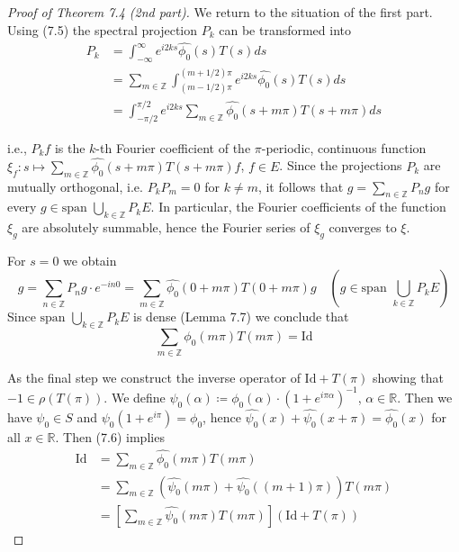 \begin{proof}[Proof of Theorem 7.4 (2nd part)]
		We return to the situation of the first part.
		Using (7.5) the spectral projection $P_{k}$ can be transformed into
		\begin{align*}
			P_{k} &= \int_{-\infty}^{\infty} e^{i2ks}\hat{\phi_{0}}(s)T(s)ds \\
			&= \sum_{m\in\mathbb{Z}} \int_{(m-1/2)\pi}^{(m+1/2)\pi} e^{i2ks}\hat{\phi_{0}}(s)T(s)ds \\
			&= \int_{-\pi/2}^{\pi/2} e^{i2ks}\sum_{m\in\mathbb{Z}}\hat{\phi_{0}}(s+m\pi)T(s+m\pi)ds
		\end{align*}


\newpage
i.e., $P_{k}f$ is the $k$-th Fourier coefficient of the $\pi$-periodic, continuous function $\xi_{f} \colon s \mapsto \sum_{m\in\mathbb{Z}} \hat{\phi_{0}}(s+m\pi)T(s+m\pi)f$, $f \in E$.
Since the projections $P_{k}$ are mutually orthogonal, i.e. $P_{k}P_{m} = 0$ for $k \neq m$, it follows that $g = \sum_{n\in\mathbb{Z}} P_{n}g$ for every $g \in \text{span }\bigcup_{k\in\mathbb{Z}} P_{k}E$.
In particular, the Fourier coefficients of the function $\xi_{g}$ are absolutely summable, hence the Fourier series of $\xi_{g}$ converges to $\xi$.

For $s = 0$ we obtain
\[
g = \sum_{n\in\mathbb{Z}} P_{n}g\cdot e^{-in0} = \sum_{m\in\mathbb{Z}} \hat{\phi_{0}}(0 + m\pi)T(0 + m\pi)g \quad (g \in \text{span }\bigcup_{k\in\mathbb{Z}} P_{k}E)
\]
Since $\text{span }\bigcup_{k\in\mathbb{Z}} P_{k}E$ is dense (Lemma 7.7) we conclude that
\begin{equation}\label{eq:a3-7.6}
	\sum_{m\in\mathbb{Z}} \phi_{0}(m\pi)T(m\pi) = \text{Id}
\end{equation}

As the final step we construct the inverse operator of $\text{Id} + T(\pi)$ showing that $-1 \in \rho(T(\pi))$.
We define $\psi_{0}(\alpha) \coloneqq \phi_{0}(\alpha)\cdot(1 + e^{i\pi\alpha})^{-1}$, $\alpha \in \mathbb{R}$.
Then we have $\psi_{0} \in S$ and $\psi_{0}(1 + e^{i\pi}) = \phi_{0}$, 
hence $\hat{\psi_{0}}(x) + \hat{\psi_{0}}(x + \pi) = \hat{\phi_{0}}(x)$ for all $x \in \mathbb{R}$.
Then (7.6) implies
\begin{align*}
	\text{Id} &= \sum_{m\in\mathbb{Z}} \hat{\phi_{0}}(m\pi)T(m\pi) \\
	&= \sum_{m\in\mathbb{Z}} (\hat{\psi_{0}}(m\pi) + \hat{\psi_{0}}((m+1)\pi))T(m\pi) \\
	&= [\sum_{m\in\mathbb{Z}} \hat{\psi_{0}}(m\pi)T(m\pi)](\text{Id} + T(\pi))
\end{align*}
\end{proof}


